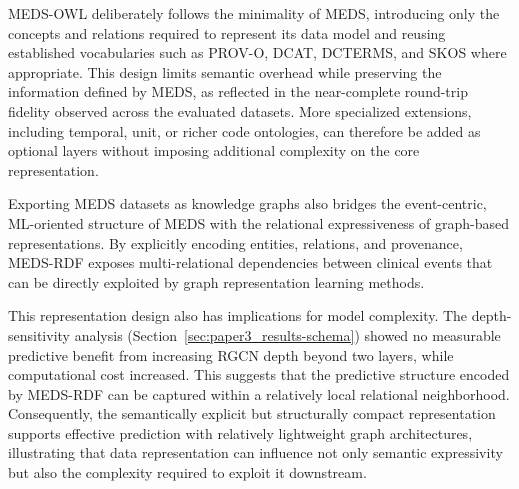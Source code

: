 MEDS-OWL deliberately follows the minimality of MEDS, introducing only the concepts and relations required to represent its data model and reusing established vocabularies such as PROV-O, DCAT, DCTERMS, and SKOS where appropriate. This design limits semantic overhead while preserving the information defined by MEDS, as reflected in the near-complete round-trip fidelity observed across the evaluated datasets. More specialized extensions, including temporal, unit, or richer code ontologies, can therefore be added as optional layers without imposing additional complexity on the core representation.

Exporting MEDS datasets as knowledge graphs also bridges the event-centric, ML-oriented structure of MEDS with the relational expressiveness of graph-based representations. By explicitly encoding entities, relations, and provenance, MEDS-RDF exposes multi-relational dependencies between clinical events that can be directly exploited by graph representation learning methods.


This representation design also has implications for model complexity. The depth-sensitivity analysis (Section~\ref{sec:paper3_results-schema}) showed no measurable predictive benefit from increasing RGCN depth beyond two layers, while computational cost increased. This suggests that the predictive structure encoded by MEDS-RDF can be captured within a relatively local relational neighborhood. Consequently, the semantically explicit but structurally compact representation supports effective prediction with relatively lightweight graph architectures, illustrating that data representation can influence not only semantic expressivity but also the complexity required to exploit it downstream.


